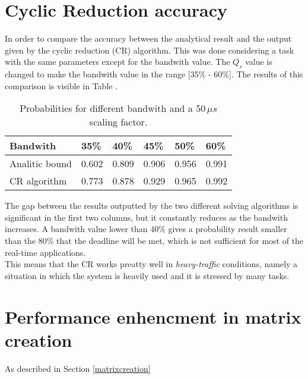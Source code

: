 \section{Cyclic Reduction accuracy}
In order to compare the accuracy between the analytical result and the output given by the cyclic reduction (CR) algorithm. This was done considering a task with the same parameters except for the bandwith value. The \( Q_{s} \) value is changed to make the bandwith value in the range [35\% - 60\%]. The results of this comparison is visible in Table .
\begin{table}[H]
\label{comparison}
\begin{center}
\begin{tabular}{| l | l | l | l | l | l |}
  \hline
  Bandwith & 35\% & 40\% & 45\% & 50\% & 60\% \\ \hline
  Analitic bound & 0.602 & 0.809 & 0.906 & 0.956 & 0.991 \\
  CR algorithm & 0.773 & 0.878 & 0.929 & 0.965 & 0.992 \\ \hline
\end{tabular}
\caption{Probabilities for different bandwith and a 50\,\( \mu{s} \) scaling factor.}
\end{center} 
\end{table}

The gap between the results outputted by the two different solving algorithms is significant in the first two columns, but it constantly reduces as the bandwith increases. A bandwith value lower than 40\% gives a probability result smaller than the 80\% that the deadline will be met, which is not sufficient for most of the real-time applications.\\
This means that the CR works preatty well in \emph{heavy-traffic} conditions, namely a situation in which the system is heavily used and it is stressed by many tasks.

\section{Performance enhencment in matrix creation} \label{matrixperformance}
As described in Section \ref{matrixcreation}
